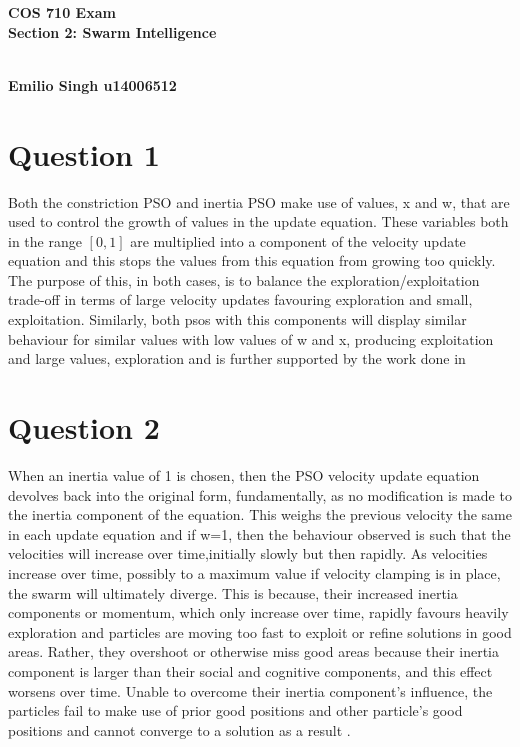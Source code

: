 \documentclass[12pt]{article}
\begin{document}
\begin{large}
\begin{flushleft}
\begin{huge}
\textbf{COS 710 Exam}
\\
\textbf{Section 2: Swarm Intelligence}
\end{huge}
\\
\textbf{Emilio Singh u14006512}

\end{flushleft}
\end{large}
\section{Question 1}
Both the constriction PSO and inertia PSO make use of values, x and w, that are used to control the growth of values in the update equation. These variables both in the range $[0,1]$ are multiplied into a component of the velocity update equation and this stops the values from this equation from growing too quickly. The purpose of this, in both cases, is to balance the exploration/exploitation trade-off in terms of large velocity updates favouring exploration and small, exploitation. Similarly, both psos with this components will display similar behaviour for similar values with low values of w and x, producing exploitation and large values, exploration and is further supported by the work done in \cite{eberhart_shi}
\section{Question 2}
When an inertia value of 1 is chosen, then the PSO velocity update equation devolves back into the original form, fundamentally, as no modification is made to the inertia component of the equation. This weighs the previous velocity the same in each update equation and if w=1, then the behaviour observed is such that the velocities will increase over time,initially slowly but then rapidly. As velocities increase over time, possibly to a maximum value if velocity clamping is in place, the swarm will ultimately diverge. This is because, their increased inertia components or momentum, which only increase over time, rapidly favours heavily exploration and particles are moving too fast to exploit or refine solutions in good areas. Rather, they overshoot or otherwise miss good areas because their inertia component is larger than their social and cognitive components, and this effect worsens over time. Unable to overcome their inertia component's influence, the particles fail to make use of prior good positions and other particle's good positions and cannot converge to a solution as a result \cite{engelCI02}. 
\end{document}
